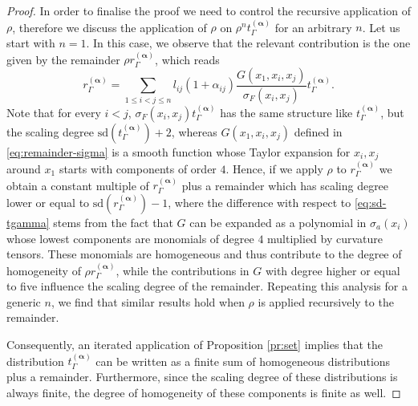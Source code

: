 \documentclass[a4paper,10pt,twoside]{article}
\numberwithin{equation}{section}
\newcounter{and}
\def\sd{\mathrm{sd}}
\def\balpha{{\boldsymbol{\alpha}}}
\theoremstyle{plain}
\theoremstyle{definition}
\begin{document}
\begin{proof}
In order to finalise the proof we need to control the recursive application of $\rho$, therefore we discuss the application of $\rho$ on $\rho^nt_\Gamma^{(\balpha)}$ for an arbitrary $n$. 
Let us start with $n=1$. In this case, we observe that the relevant contribution is the one given by the remainder $\rho r^{(\balpha)}_\Gamma$, which reads 
\[
r^{(\balpha)}_\Gamma = \sum_{1\leq i < j \leq n} l_{ij}(1+ \alpha_{ij}) \frac{G(x_1,x_i,x_j)}{\sigma_F(x_i,x_j)}t_\Gamma^{(\balpha)}.
\]
Note that for every $i<j$, $\sigma_F(x_i,x_j)t_\Gamma^{(\balpha)}$ has the same structure like $t_\Gamma^{(\balpha)}$, but the scaling degree $\sd(t_\Gamma^{(\balpha)}) +2$, whereas $G(x_1,x_i,x_j)$ defined in \eqref{eq:remainder-sigma} is a smooth function whose Taylor expansion for $x_i, x_j$ around $x_1$ starts with components of order $4$. Hence, if we apply $\rho$ to $r^{(\balpha)}_\Gamma$ we obtain
a constant multiple of $r^{(\balpha)}_\Gamma$ plus a remainder which has scaling degree lower or equal to $\sd(r^{(\balpha)}_\Gamma)-1$, where the difference with respect to \eqref{eq:sd-tgamma} stems from the fact that $G$ can be expanded as a polynomial in $\sigma_a(x_i)$ whose lowest components are monomials of degree $4$ multiplied by curvature tensors. These monomials are homogeneous and thus contribute to the degree of homogeneity of $\rho r^{(\balpha)}_\Gamma$, while the contributions in $G$ with degree higher or equal to five influence the scaling degree of the remainder.
Repeating this analysis for a generic $n$, we find that similar results hold when $\rho$ is applied recursively to the remainder.

Consequently, an iterated application of Proposition \ref{pr:set} implies that the distribution $t_\Gamma^{(\balpha)}$ can be written as a finite sum of homogeneous distributions plus a remainder. Furthermore, since the scaling degree of these distributions is always finite, the degree of homogeneity of these components is finite as well. 
\end{proof}
\end{document}
